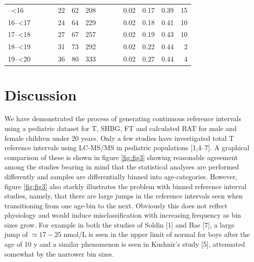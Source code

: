 \documentclass[]{elsarticle} %
\begin{document}
\begin{table}[H]
\begin{tabular}[t]{l>{}r>{}r>{}rrrr>{}r>{}r>{}rrrrr}
\addlinespace
15--<16 & \cellcolor[HTML]{ececec}{0.08} & \cellcolor[HTML]{ececec}{0.56} & \cellcolor[HTML]{ececec}{1.47} & 22 & 62 & 208 & \cellcolor[HTML]{ececec}{0.99} & \cellcolor[HTML]{ececec}{7.29} & \cellcolor[HTML]{ececec}{16.50} & 0.02 & 0.17 & 0.39 & 15\\
16--<17 & \cellcolor[HTML]{ececec}{0.11} & \cellcolor[HTML]{ececec}{0.55} & \cellcolor[HTML]{ececec}{1.41} & 24 & 64 & 229 & \cellcolor[HTML]{ececec}{1.00} & \cellcolor[HTML]{ececec}{7.57} & \cellcolor[HTML]{ececec}{17.44} & 0.02 & 0.18 & 0.41 & 10\\
17--<18 & \cellcolor[HTML]{ececec}{0.16} & \cellcolor[HTML]{ececec}{0.60} & \cellcolor[HTML]{ececec}{1.36} & 27 & 67 & 257 & \cellcolor[HTML]{ececec}{1.00} & \cellcolor[HTML]{ececec}{8.14} & \cellcolor[HTML]{ececec}{18.13} & 0.02 & 0.19 & 0.43 & 10\\
18--<19 & \cellcolor[HTML]{ececec}{0.21} & \cellcolor[HTML]{ececec}{0.74} & \cellcolor[HTML]{ececec}{1.38} & 31 & 73 & 292 & \cellcolor[HTML]{ececec}{0.97} & \cellcolor[HTML]{ececec}{9.38} & \cellcolor[HTML]{ececec}{18.58} & 0.02 & 0.22 & 0.44 & 2\\
19--<20 & \cellcolor[HTML]{ececec}{0.28} & \cellcolor[HTML]{ececec}{1.00} & \cellcolor[HTML]{ececec}{1.48} & 36 & 80 & 333 & \cellcolor[HTML]{ececec}{0.92} & \cellcolor[HTML]{ececec}{11.38} & \cellcolor[HTML]{ececec}{18.78} & 0.02 & 0.27 & 0.44 & 4\\
\bottomrule
\end{tabular}
\end{table}

\hypertarget{discussion}{%
\section{Discussion}\label{discussion}}

We have demonstrated the process of generating continuous reference
intervals using a pediatric dataset for T, SHBG, FT and calculated BAT
for male and female children under 20 years. Only a few studies have
investigated total T reference intervals using LC-MS/MS in pediatric
populations {[}1,4--7{]}. A graphical comparison of these is shown in
figure \ref{fig:fig3} showing reasonable agreement among the studies
bearing in mind that the statistical analyses are performed differently
and samples are differentially binned into age-categories. However,
figure \ref{fig:fig3} also starkly illustrates the problem with binned
reference interval studies, namely, that there are large jumps in the
reference intervals seen when transitioning from one age-bin to the
next. Obviously this does not reflect physiology and would induce
misclassification with increasing frequency as bin sizes grow. For
example in both the studies of Soldin {[}1{]} and Bae {[}7{]}, a large
jump of \(\simeq 17-25\) nmol/L is seen in the upper limit of normal for
boys after the age of 10 y and a similar phenomenon is seen in Kushnir's
study {[}5{]}, attenuated somewhat by the narrower bin sizes.
\end{document}
